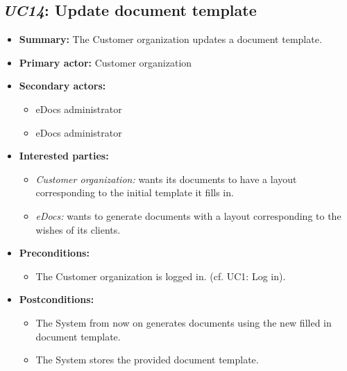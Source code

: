 \documentclass[a4paper,10pt]{article}
\begin{document}
\subsection{\emph{UC14}: Update document template}
\begin{itemize}
	\item \textbf{Summary:} The Customer organization updates a document template.
    \item \textbf{Primary actor:} Customer organization
    \item \textbf{Secondary actors:} 
    	\begin{itemize}
        	\item eDocs administrator
        	\item eDocs administrator
        \end{itemize}
    \item \textbf{Interested parties:} 
        \begin{itemize}
            \item \textit{Customer organization:} wants its documents to have a layout corresponding to the initial template it fills in.
            \item \textit{eDocs:} wants to generate documents with a layout corresponding to the wishes of its clients.
        \end{itemize}

    \item \textbf{Preconditions:}
        \begin{itemize}
            \item The Customer organization is logged in. (cf. UC1: Log in).
        \end{itemize}

    \item \textbf{Postconditions:}
        \begin{itemize}
            \item The System from now on generates documents using the new filled in document template.
            \item The System stores the provided document template.
        \end{itemize}
        

\end{itemize}
\end{document}
